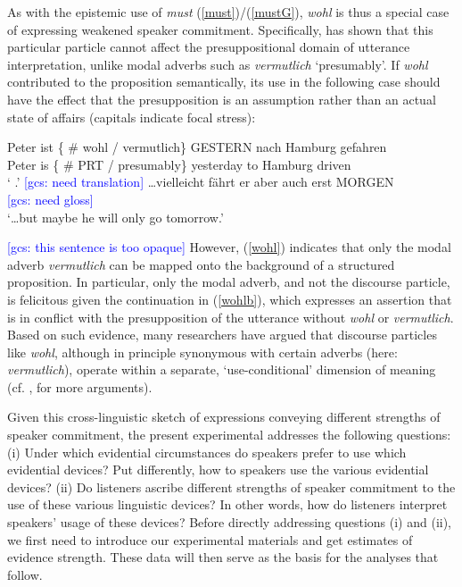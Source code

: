 \documentclass[11pt]{article}
\newcommand{\gcs}[1]{\textcolor{blue}{[gcs: #1]}}
\begin{document}
As with the epistemic use of \emph{must} (\ref{must})/(\ref{mustG}), \emph{wohl} is thus a special case of expressing weakened speaker commitment. Specifically, \cite{Zimmermann2004, Zimmermann2008} has shown that this particular particle cannot affect the presuppositional domain of utterance interpretation, unlike modal adverbs such as \emph{vermutlich} `presumably'. If \emph{wohl} contributed to the proposition semantically, its use in the following case should have the effect that the presupposition is an assumption rather than an actual state of affairs (capitals indicate focal stress):

\begin{exe}
\ex \label{wohl}
\begin{xlist}
\ex \gll Peter	ist	\{ \#	wohl  /	vermutlich\}	GESTERN			nach	 Hamburg	 gefahren	\\
		Peter	is		\{ \#	PRT  /   presumably\}	yesterday 		to	 Hamburg	 driven	\\	
\trans ` .' \gcs{need translation}
\ex \label{wohlb} \gll \ldots vielleicht fährt er aber	auch erst MORGEN\\
\gcs{need gloss}\\
\trans `\ldots but maybe he will only go tomorrow.' 
\end{xlist}
\end{exe}
	
	
\gcs{this sentence is too opaque} However, (\ref{wohl}) indicates that only the modal adverb \emph{vermutlich} can be mapped onto the background of a structured proposition. In particular, only the modal adverb, and not the discourse particle, is felicitous given the continuation in (\ref{wohlb}), which expresses an assertion that is in conflict with the presupposition of the utterance without \emph{wohl} or \emph{vermutlich}. Based on such evidence, many researchers have argued that discourse particles like \emph{wohl}, although in principle synonymous with certain adverbs (here: \emph{vermutlich}), operate within a separate, `use-conditional' dimension of meaning (cf. \citealp[][pp.~215--268]{Gutzmann2015}, for more arguments).

Given this cross-linguistic sketch of expressions conveying different strengths of speaker commitment, the present experimental addresses the following questions: (i) Under which evidential circumstances do speakers prefer to use which evidential devices?  Put differently, how to speakers use the various evidential devices? (ii) Do listeners ascribe different strengths of speaker commitment to the use of these various linguistic devices? In other words, how do listeners interpret speakers' usage of these devices? Before directly addressing questions (i) and (ii), we first need to introduce our experimental materials and get estimates of evidence strength. These data will then serve as the basis for the analyses that follow.
\end{document}
